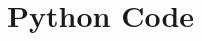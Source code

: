\documentclass{article}
\begin{document}
\begin{appendices}
\begin{itemize}
\label{itemize:functions}
\end{itemize}

\section{Python Code}
\inputminted{python}{HW3_DanielBurnham.py}
\label{appendix:code}

\end{appendices}
\end{document}
